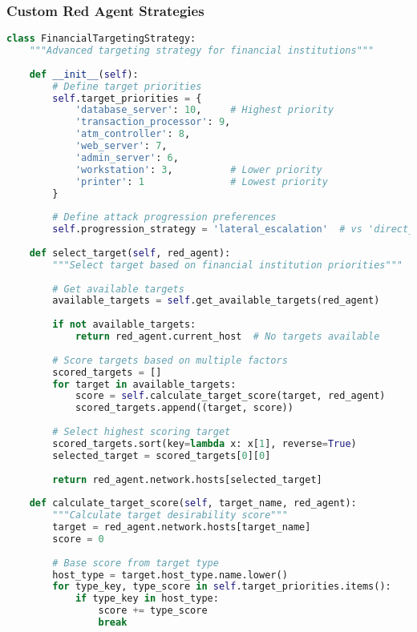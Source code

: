 \documentclass[12pt,a4paper]{article}
\begin{document}
\subsubsection{Custom Red Agent Strategies}
\begin{lstlisting}[language=Python, caption=Custom Red Agent Strategy]
class FinancialTargetingStrategy:
    """Advanced targeting strategy for financial institutions"""
    
    def __init__(self):
        # Define target priorities
        self.target_priorities = {
            'database_server': 10,     # Highest priority
            'transaction_processor': 9,
            'atm_controller': 8,
            'web_server': 7,
            'admin_server': 6,
            'workstation': 3,          # Lower priority
            'printer': 1               # Lowest priority
        }
        
        # Define attack progression preferences
        self.progression_strategy = 'lateral_escalation'  # vs 'direct_attack'
    
    def select_target(self, red_agent):
        """Select target based on financial institution priorities"""
        
        # Get available targets
        available_targets = self.get_available_targets(red_agent)
        
        if not available_targets:
            return red_agent.current_host  # No targets available
        
        # Score targets based on multiple factors
        scored_targets = []
        for target in available_targets:
            score = self.calculate_target_score(target, red_agent)
            scored_targets.append((target, score))
        
        # Select highest scoring target
        scored_targets.sort(key=lambda x: x[1], reverse=True)
        selected_target = scored_targets[0][0]
        
        return red_agent.network.hosts[selected_target]
    
    def calculate_target_score(self, target_name, red_agent):
        """Calculate target desirability score"""
        target = red_agent.network.hosts[target_name]
        score = 0
        
        # Base score from target type
        host_type = target.host_type.name.lower()
        for type_key, type_score in self.target_priorities.items():
            if type_key in host_type:
                score += type_score
                break
        

\end{lstlisting}
\end{document}
